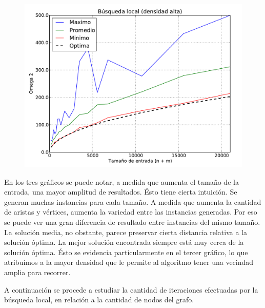\begin{figure}[H]
\begin{center}
\includegraphics[angle=0, scale=.75]{imagenes/calidad_local_search_2014-06-27_08-54-45.pdf}
\label{grafico local}
\end{center}
\end{figure}

En los tres gráficos se puede notar, a medida que aumenta el tamaño de la entrada, una mayor amplitud de resultados. Ésto tiene cierta intuición. 
Se generan muchas instancias para cada tamaño. A medida que aumenta la cantidad de aristas y vértices, aumenta la variedad entre las instancias
generadas. Por eso se puede ver una gran diferencia de resultado entre instancias del mismo tamaño.
La solución media, no obstante, parece preservar cierta distancia relativa a la solución óptima.
La mejor solución encontrada siempre está muy cerca de la solución óptima. Ésto se evidencia particularmente en el tercer gráfico, lo que
atribuímos a la mayor densidad que le permite al algoritmo tener una vecindad amplia para recorrer.

A continuación se procede a estudiar la cantidad de iteraciones efectuadas por la búsqueda local, en relación a la cantidad de nodos del grafo.

